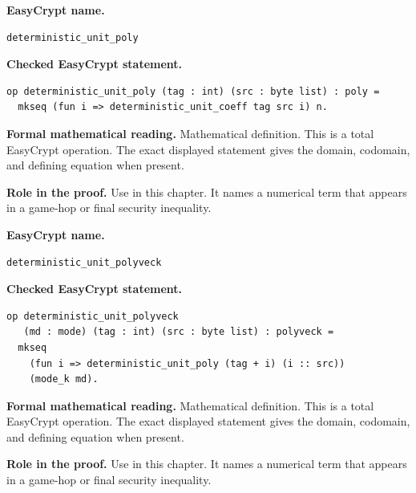 \begin{formaldefinition}
\noindent\textbf{EasyCrypt name.}
\begin{lstlisting}[language=EasyCrypt,basicstyle=\ttfamily\scriptsize]
deterministic_unit_poly
\end{lstlisting}
\noindent\textbf{Checked EasyCrypt statement.}
\begin{lstlisting}[language=EasyCrypt,basicstyle=\ttfamily\scriptsize]
op deterministic_unit_poly (tag : int) (src : byte list) : poly =
  mkseq (fun i => deterministic_unit_coeff tag src i) n.
\end{lstlisting}
\noindent\textbf{Formal mathematical reading.}
Mathematical definition. This is a total EasyCrypt operation.  The exact displayed statement gives the domain, codomain, and defining equation when present.

\noindent\textbf{Role in the proof.}
Use in this chapter. It names a numerical term that appears in a game-hop or final security inequality.

\end{formaldefinition}

\begin{formaldefinition}
\noindent\textbf{EasyCrypt name.}
\begin{lstlisting}[language=EasyCrypt,basicstyle=\ttfamily\scriptsize]
deterministic_unit_polyveck
\end{lstlisting}
\noindent\textbf{Checked EasyCrypt statement.}
\begin{lstlisting}[language=EasyCrypt,basicstyle=\ttfamily\scriptsize]
op deterministic_unit_polyveck
   (md : mode) (tag : int) (src : byte list) : polyveck =
  mkseq
    (fun i => deterministic_unit_poly (tag + i) (i :: src))
    (mode_k md).
\end{lstlisting}
\noindent\textbf{Formal mathematical reading.}
Mathematical definition. This is a total EasyCrypt operation.  The exact displayed statement gives the domain, codomain, and defining equation when present.

\noindent\textbf{Role in the proof.}
Use in this chapter. It names a numerical term that appears in a game-hop or final security inequality.

\end{formaldefinition}


